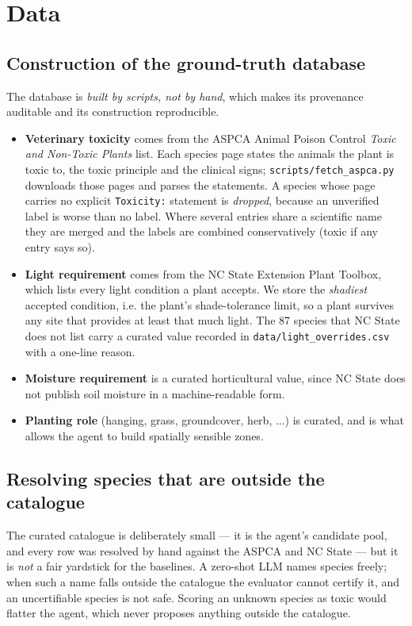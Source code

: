 \documentclass[12pt,a4paper]{article}
\begin{document}
\section{Data}

\subsection{Construction of the ground-truth database}

The database is \emph{built by scripts, not by hand}, which makes its
provenance auditable and its construction reproducible.

\begin{itemize}
  \item \textbf{Veterinary toxicity} comes from the ASPCA Animal Poison
    Control \emph{Toxic and Non-Toxic Plants} list. Each species page states
    the animals the plant is toxic to, the toxic principle and the clinical
    signs; \texttt{scripts/fetch\_aspca.py} downloads those pages and parses
    the statements. A species whose page carries no explicit \texttt{Toxicity:}
    statement is \emph{dropped}, because an unverified label is worse than no
    label. Where several entries share a scientific name they are merged and
    the labels are combined conservatively (toxic if any entry says so).
  \item \textbf{Light requirement} comes from the NC State Extension Plant
    Toolbox, which lists every light condition a plant accepts. We store the
    \emph{shadiest} accepted condition, i.e. the plant's shade-tolerance
    limit, so a plant survives any site that provides at least that much
    light. The 87 species that NC State does not list carry a curated value
    recorded in \texttt{data/light\_overrides.csv} with a one-line reason.
  \item \textbf{Moisture requirement} is a curated horticultural value, since
    NC State does not publish soil moisture in a machine-readable form.
  \item \textbf{Planting role} (hanging, grass, groundcover, herb, ...) is
    curated, and is what allows the agent to build spatially sensible zones.
\end{itemize}

\subsection{Resolving species that are outside the catalogue}
\label{sec:resolving}

The curated catalogue is deliberately small --- it is the agent's candidate
pool, and every row was resolved by hand against the ASPCA and NC State --- but
it is \emph{not} a fair yardstick for the baselines. A zero-shot LLM names
species freely; when such a name falls outside the catalogue the evaluator
cannot certify it, and an uncertifiable species is not safe. Scoring an
unknown species as toxic would flatter the agent, which never proposes
anything outside the catalogue.
\end{document}
